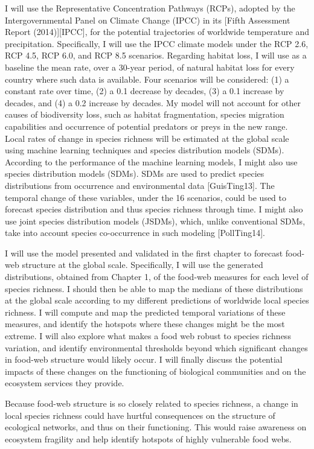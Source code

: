 I will use the Representative
Concentration Pathways (RCPs), adopted by the Intergovernmental Panel on Climate
Change (IPCC) in its [Fifth Assessment Report (2014)][IPCC], for the potential
trajectories of worldwide temperature and precipitation. Specifically, I will
use the IPCC climate models under the RCP 2.6, RCP 4.5, RCP 6.0, and RCP 8.5
scenarios. Regarding habitat loss, I will use as a baseline the mean rate, over a 30-year
period, of natural habitat loss for every country where such data is available.
Four scenarios will be considered: (1) a constant rate over time, (2) a 0.1
decrease by decades, (3) a 0.1 increase by decades, and (4) a 0.2 increase by
decades. My model will not account for other causes of biodiversity loss, such as habitat
fragmentation, species migration capabilities and occurrence of potential
predators or preys in the new range. Local rates of change in species richness will be
estimated at the global scale using machine learning techniques and species
distribution models (SDMs). According to the performance of the machine learning models, I might also use
species distribution models (SDMs). SDMs are used to predict species
distributions  from occurrence and environmental data [GuisTing13]. The temporal
change of these variables, under the 16 scenarios, could be used to forecast
species distribution and thus species richness through time. I might also use
joint species distribution models (JSDMs), which, unlike conventional SDMs, take
into account species co-occurrence in such modeling [PollTing14].

I will use the model presented and validated in
the first chapter to forecast food-web structure at the global scale.
Specifically, I will use the generated distributions, obtained from Chapter 1,
of the food-web measures for each level of species richness. I should then be
able to map the medians of these distributions at the global scale according to
my different predictions of worldwide local species richness. I will compute and map the predicted temporal variations of these measures, and
identify the hotspots where these changes might be the most extreme. I will also
explore what makes a food web robust to species richness variation, and identify
environmental thresholds beyond which significant changes in food-web structure
would likely occur. I will finally discuss the potential impacts of these changes on the functioning
of biological communities and on the ecosystem services they provide.

Because food-web structure
is so closely related to species richness, a change in local species richness
could have hurtful consequences on the structure of ecological networks, and
thus on their functioning. This would raise awareness on ecosystem fragility and help
identify hotspots of highly vulnerable food webs.


\endinput

